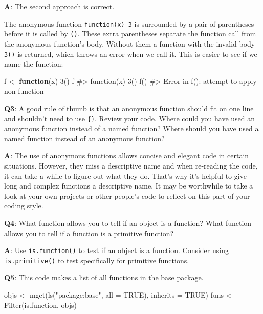 \documentclass[
]{krantz}
\makeatletter
\newenvironment{Shaded}{\begin{snugshade}}{\end{snugshade}}
\newcommand{\CommentTok}[1]{\textcolor[rgb]{0.56,0.35,0.01}{\textit{#1}}}
\newcommand{\ControlFlowTok}[1]{\textcolor[rgb]{0.13,0.29,0.53}{\textbf{#1}}}
\newcommand{\DataTypeTok}[1]{\textcolor[rgb]{0.13,0.29,0.53}{#1}}
\newcommand{\DecValTok}[1]{\textcolor[rgb]{0.00,0.00,0.81}{#1}}
\newcommand{\KeywordTok}[1]{\textcolor[rgb]{0.13,0.29,0.53}{\textbf{#1}}}
\newcommand{\NormalTok}[1]{#1}
\newcommand{\OtherTok}[1]{\textcolor[rgb]{0.56,0.35,0.01}{#1}}
\newcommand{\StringTok}[1]{\textcolor[rgb]{0.31,0.60,0.02}{#1}}
\newenvironment{kframe}{%
\medskip{}
\setlength{\fboxsep}{.8em}
 \def\at@end@of@kframe{}%
 \ifinner\ifhmode%
  \def\at@end@of@kframe{\end{minipage}}%
  \begin{minipage}{\columnwidth}%
 \fi\fi%
 \def\FrameCommand##1{\hskip\@totalleftmargin \hskip-\fboxsep
 \colorbox{shadecolor}{##1}\hskip-\fboxsep
     \hskip-\linewidth \hskip-\@totalleftmargin \hskip\columnwidth}%
 \MakeFramed {\advance\hsize-\width
   \@totalleftmargin\z@ \linewidth\hsize
   \@setminipage}}%
 {\par\unskip\endMakeFramed%
 \at@end@of@kframe}
\renewenvironment{Shaded}{\begin{kframe}}{\end{kframe}}
\renewcommand{\KeywordTok} [1]{\textcolor[rgb]{0.00,0.44,0.13}{{#1}}}
\renewcommand{\DataTypeTok}[1]{\textcolor[rgb]{0.56,0.13,0.00}{{#1}}}
\renewcommand{\DecValTok}  [1]{\textcolor[rgb]{0.25,0.63,0.44}{{#1}}}
\renewcommand{\StringTok}  [1]{\textcolor[rgb]{0.25,0.44,0.63}{{#1}}}
\renewcommand{\CommentTok} [1]{\textcolor[rgb]{0.38,0.63,0.69}{{#1}}}
\renewcommand{\OtherTok}   [1]{\textcolor[rgb]{0.00,0.44,0.13}{{#1}}}
\renewcommand{\NormalTok}  [1]{{#1}}
\makeatother
\begin{document}
\textbf{{A}}: The second approach is correct.

The anonymous function \texttt{function(x)\ 3} is surrounded by a pair of parentheses before it is called by \texttt{()}. These extra parentheses separate the function call from the anonymous function's body. Without them a function with the invalid body \texttt{3()} is returned, which throws an error when we call it. This is easier to see if we name the function:

\begin{Shaded}
\begin{Highlighting}[]
\NormalTok{f <-}\StringTok{ }\ControlFlowTok{function}\NormalTok{(x) }\DecValTok{3}\NormalTok{()}
\NormalTok{f}
\CommentTok{#> function(x) 3()}
\KeywordTok{f}\NormalTok{()}
\CommentTok{#> Error in f(): attempt to apply non-function}
\end{Highlighting}
\end{Shaded}

\textbf{{Q3}}: A good rule of thumb is that an anonymous function should fit on one line and shouldn't need to use \texttt{\{\}}. Review your code. Where could you have used an anonymous function instead of a named function? Where should you have used a named function instead of an anonymous function?

\textbf{{A}}: The use of anonymous functions allows concise and elegant code in certain situations. However, they miss a descriptive name and when re-reading the code, it can take a while to figure out what they do. That's why it's helpful to give long and complex functions a descriptive name. It may be worthwhile to take a look at your own projects or other people's code to reflect on this part of your coding style.

\textbf{{Q4}}: What function allows you to tell if an object is a function? What function allows you to tell if a function is a primitive function?

\textbf{{A}}: Use \texttt{is.function()} to test if an object is a function. Consider using \texttt{is.primitive()} to test specifically for primitive functions.

\textbf{{Q5}}: This code makes a list of all functions in the base package.

\begin{Shaded}
\begin{Highlighting}[]
\NormalTok{objs <-}\StringTok{ }\KeywordTok{mget}\NormalTok{(}\KeywordTok{ls}\NormalTok{(}\StringTok{"package:base"}\NormalTok{, }\DataTypeTok{all =} \OtherTok{TRUE}\NormalTok{), }\DataTypeTok{inherits =} \OtherTok{TRUE}\NormalTok{)}
\NormalTok{funs <-}\StringTok{ }\KeywordTok{Filter}\NormalTok{(is.function, objs)}
\end{Highlighting}
\end{Shaded}
\end{document}
